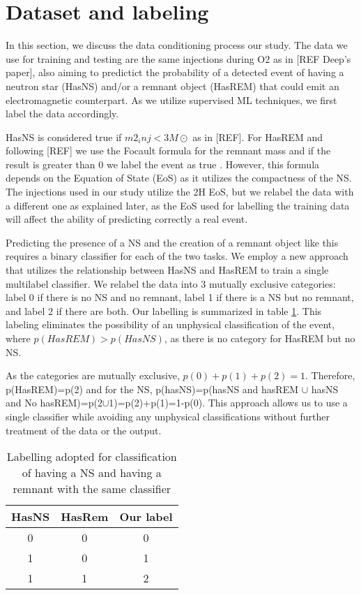 \section{Dataset and labeling}
\label{sec:dataset}
In this section, we discuss the data conditioning process our study. The data we use for training and testing are the same injections during O2 as in  [REF Deep's paper], also aiming to predictict the probability of a detected event of having a neutron star (HasNS) and/or a remnant object (HasREM) that could emit an electromagnetic counterpart. As we utilize supervised ML techniques, we first label the data accordingly.

HasNS is considered true if $m2_inj< 3M\odot$ as in [REF]. For HasREM and following [REF] we use the Focault formula for the remnant mass and if the result is greater than 0 we label the event as true . However, this formula depends on the Equation of State (EoS) as it utilizes the compactness of the NS. The injections used in our study utilize the 2H EoS, but we relabel the data with a different one as explained later, as the EoS used for labelling the training data will affect the ability of predicting correctly a real event.

Predicting the presence of a NS and the creation of a remnant object like this requires a binary classifier for each of the two tasks. We employ a new approach that utilizes the relationship between HasNS and HasREM to train a single multilabel classifier. We relabel the data into 3 mutually exclusive categories: label 0 if there is no NS and no remnant, label 1 if there is a NS but no remnant, and label 2 if there are both. Our labelling is summarized in table \ref{tab:labels}. This labeling eliminates the possibility of an unphysical classification of the event, where $p(HasREM)>p(HasNS)$, as there is no category for HasREM but no NS.

As the categories are mutually exclusive, $p(0)+p(1)+p(2)=1$. Therefore, p(HasREM)=p(2) and for the NS, p(hasNS)=p(hasNS and hasREM $\cup$ hasNS and No hasREM)=p(2$\cup$1)=p(2)+p(1)=1-p(0). This approach allows us to use a single classifier while avoiding any unphysical classifications without further treatment of the data or the output.

\begin{table}[h]
\centering
\begin{tabular}{@{}ccc@{}}
\toprule
HasNS & HasRem & Our label \\ \midrule
0     & 0      & 0         \\
1     & 0      & 1         \\
1     & 1      & 2         \\ \bottomrule
\end{tabular}
\caption{Labelling adopted for classification of having a NS and having a remnant with the same classifier}
\label{tab:labels}
\end{table}

